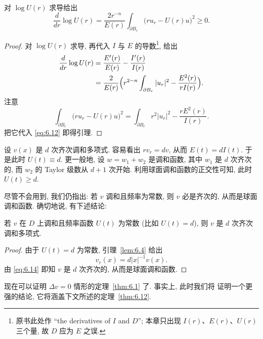 \begin{lemma}
\label{lem:6.4}
对 $\log U(r)$ 求导给出
\begin{equation}
\frac{d}{dr}\log U(r)=\frac{2r^{-n}}{E(r)}
\int_{\partial B_r}\bigl(ru_r-U(r)u\bigr)^2\geq0.
\label{eq:6.11}
\end{equation}
\end{lemma}

\begin{proof}
对 $\log U(r)$ 求导, 再代入 $I$ 与 $E$ 的导数\footnote{原书此处作
``the derivatives of $I$ and $D$''; 本章只出现 $I(r)$、$E(r)$、$U(r)$
三个量, 故 $D$ 应为 $E$ 之误.}, 给出
\begin{align}
\frac{d}{dr}\log U(r)
&=\frac{E'(r)}{E(r)}-\frac{I'(r)}{I(r)}\notag\\
&=\frac{2}{E(r)}\Bigl(r^{2-n}\int_{\partial B_r}|u_r|^2
-\frac{E^2(r)}{rI(r)}\Bigr).
\label{eq:6.12}
\end{align}
注意
\begin{equation}
\int_{\partial B_r}\bigl(ru_r-U(r)u\bigr)^2
=\int_{\partial B_r}r^2|u_r|^2-\frac{rE^2(r)}{I(r)}.
\label{eq:6.13}
\end{equation}
把它代入 \eqref{eq:6.12} 即得引理.
\end{proof}

\begin{example}
\label{ex:6.5}
设 $v(x)$ 是 $d$ 次齐次调和多项式. 容易看出 $rv_r=dv$, 从而
$E(t)=dI(t)$. 于是此时 $U(t)\equiv d$. 更一般地, 设
$w=w_1+w_2$ 是调和函数, 其中 $w_1$ 是 $d$ 次齐次的, 而 $w_2$ 的
Taylor 级数从 $d+1$ 次开始. 利用球面调和函数的正交性可知, 此时
$U(t)\geq d$.
\end{example}

尽管不会用到, 我们仍指出: 若 $v$ 调和且频率为常数, 则 $v$ 必是齐次的,
从而是球面调和函数. 确切地说, 有下述结论:

\begin{lemma}
\label{lem:6.6}
若 $v$ 在 $D$ 上调和且频率函数 $U(t)$ 为常数 (比如 $U(t)=d$), 则 $v$
是 $d$ 次齐次调和多项式.
\end{lemma}

\begin{proof}
由于 $U(t)=d$ 为常数, 引理~\ref{lem:6.4} 给出
\begin{equation}
v_r(x)=d|x|^{-1}v(x).
\label{eq:6.14}
\end{equation}
由 \eqref{eq:6.14} 即知 $v$ 是 $d$ 次齐次的, 从而是球面调和函数.
\end{proof}

现在可以证明 $\Delta v=0$ 情形的定理~\ref{thm:6.1} 了. 事实上, 此时我们将
证明一个更强的结论, 它将涵盖下文所述的定理~\ref{thm:6.12}.

